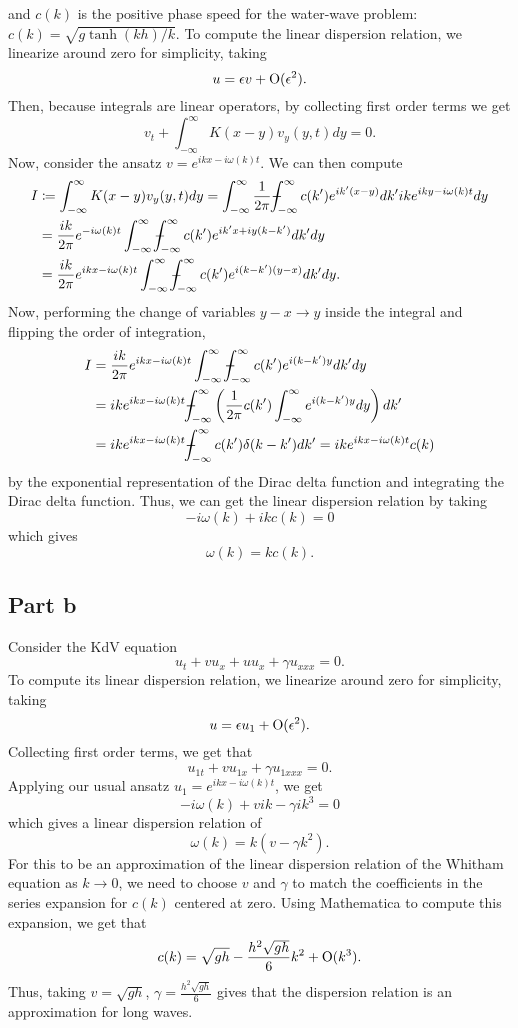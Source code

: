 \documentclass{article}
\begin{document}
and $c(k)$ is the positive phase speed for the water-wave problem: $c(k)=\sqrt{g\tanh(kh)/k}$. To compute the linear dispersion relation, we linearize around zero for simplicity, taking
\[
u=\epsilon v+\operatorname{O}(\epsilon^2).
\] 
Then, because integrals are linear operators, by collecting first order terms we get
\[
v_t+\int_{-\infty}^\infty K(x-y)v_y(y,t)dy=0.
\]
Now, consider the ansatz $v=e^{ikx-i\omega(k)t}$. We can then compute 
\begin{align*}
I &\coloneqq\int_{-\infty}^\infty K(x-y)v_y(y,t)dy=\int_{-\infty}^\infty\frac{1}{2\pi}\pvint_{-\infty}^\infty c(k')e^{ik'(x-y)}dk'ike^{iky-i\omega(k)t}dy\\&=
\frac{ik}{2\pi}e^{-i\omega(k)t}\int_{-\infty}^\infty\pvint_{-\infty}^\infty c(k')e^{ik'x+iy(k-k')}dk'dy\\&=
\frac{ik}{2\pi}e^{ikx-i\omega(k)t}\int_{-\infty}^\infty\pvint_{-\infty}^\infty c(k')e^{i(k-k')(y-x)}dk'dy.
\end{align*}
Now, performing the change of variables $y-x\to y$ inside the integral and flipping the order of integration, 
\begin{align*}
I&=\frac{ik}{2\pi}e^{ikx-i\omega(k)t}\int_{-\infty}^\infty\pvint_{-\infty}^\infty c(k')e^{i(k-k')y}dk'dy\\&=
ike^{ikx-i\omega(k)t}\pvint_{-\infty}^\infty\left(\frac{1}{2\pi}c(k')\int_{-\infty}^\infty e^{i(k-k')y}dy\right)dk'\\&=
ike^{ikx-i\omega(k)t}\pvint_{-\infty}^\infty c(k')\delta(k-k')dk'=ike^{ikx-i\omega(k)t}c(k)
\end{align*}
by the exponential representation of the Dirac delta function and integrating the Dirac delta function. 
Thus, we can get the linear dispersion relation by taking
\[
-i\omega(k)+ikc(k)=0
\]
which gives 
\[
\omega(k)=kc(k).
\]

\subsection{Part b}
Consider the KdV equation 
\[
u_t+vu_x+u u_x+\gamma u_{xxx}=0.
\]
To compute its linear dispersion relation, we linearize around zero for simplicity, taking
\[
u=\epsilon u_1+\operatorname{O}(\epsilon^2).
\]
Collecting first order terms, we get that 
\[
u_{1t}+vu_{1x}+\gamma u_{1xxx}=0.
\] 
Applying our usual ansatz $u_1=e^{ikx-i\omega(k)t}$, we get
\[
-i\omega(k)+vik-\gamma ik^3=0
\]
which gives a linear dispersion relation of
\[
\omega(k)=k(v-\gamma k^2). 
\]
For this to be an approximation of the linear dispersion relation of the Whitham equation as $k\to0$, we need to choose $v$ and $\gamma$ to match the coefficients in the series expansion for $c(k)$ centered at zero. Using Mathematica to compute this expansion, we get that
\[
c(k)=\sqrt{gh}-\frac{h^2\sqrt{gh}}{6}k^2+\operatorname{O}(k^3). 
\]
Thus, taking $v=\sqrt{gh}$, $\gamma=\frac{h^2\sqrt{gh}}{6}$ gives that the dispersion relation is an approximation for long waves.
\end{document}
